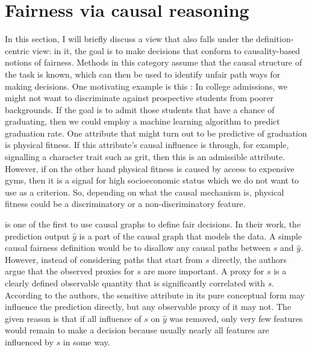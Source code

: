 \section{Fairness via causal reasoning}%
\label{sec:fairness-definition-based-on-causal-reasoning}
In this section, I will briefly discuss a view that also falls under the definition-centric view:
in it, the goal is to make decisions that conform to causality-based notions of fairness.
Methods in this category assume that the causal structure of the task is known,
which can then be used to identify unfair path ways for making decisions.
One motivating example is this \citep{dedeo2014wrong}:
In college admissions, we might not want to discriminate against prospective students from poorer backgrounds.
If the goal is to admit those students that have a chance of graduating,
then we could employ a machine learning algorithm to predict graduation rate.
One attribute that might turn out to be predictive of graduation is physical fitness.
If this attribute's causal influence is through,
for example, signalling a character trait such as grit,
then this is an admissible attribute.
However, if on the other hand physical fitness is caused by access to expensive gyms,
then it is a signal for high socioeconomic status which we do not want to use as a criterion.
So, depending on what the causal mechanism is,
physical fitness could be a discriminatory or a non-discriminatory feature.


\citet{kilbertus2017avoiding} is one of the first to use causal graphs to define fair decisions.
In their work, the prediction output \(\hat{y}\) is a part of the causal graph that models the data.
A simple causal fairness definition would be to disallow any causal paths between \(s\) and \(\hat{y}\).
However, instead of considering paths that start from \(s\) directly,
the authors argue that the observed proxies for \(s\) are more important.
A proxy for \(s\) is a clearly defined observable quantity
that is significantly correlated with \(s\).
According to the authors,
the sensitive attribute in its pure conceptual form may influence the prediction directly,
but any observable proxy of it may not.
The given reason is that if all influence of \(s\) on \(\hat{y}\) was removed,
only very few features would remain to make a decision
because usually nearly all features are influenced by \(s\) in some way.

